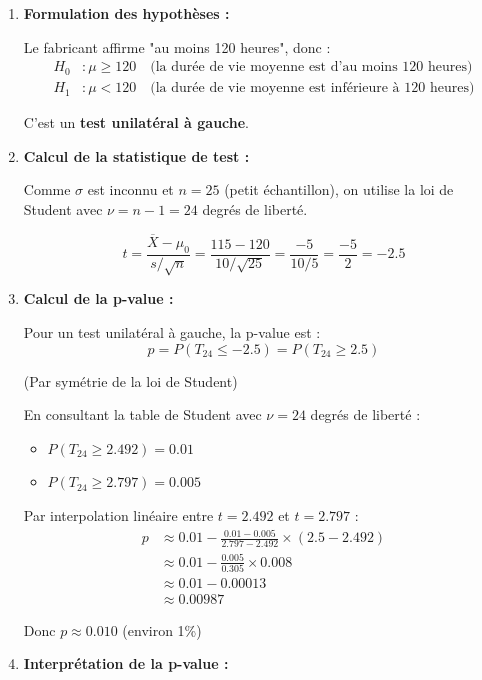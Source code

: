 \documentclass[11pt,a4paper]{article}
\begin{document}
\begin{enumerate}
    \item \textbf{Formulation des hypothèses :}
    
    Le fabricant affirme "au moins 120 heures", donc :
    \begin{align}
    H_0 &: \mu \geq 120 \quad \text{(la durée de vie moyenne est d'au moins 120 heures)} \\
    H_1 &: \mu < 120 \quad \text{(la durée de vie moyenne est inférieure à 120 heures)}
    \end{align}
    
    C'est un \textbf{test unilatéral à gauche}.
    
    \item \textbf{Calcul de la statistique de test :}
    
    Comme $\sigma$ est inconnu et $n = 25$ (petit échantillon), on utilise la loi de Student avec $\nu = n - 1 = 24$ degrés de liberté.
    
    $$t = \frac{\overline{X} - \mu_0}{s/\sqrt{n}} = \frac{115 - 120}{10/\sqrt{25}} = \frac{-5}{10/5} = \frac{-5}{2} = -2.5$$
    
    \item \textbf{Calcul de la p-value :}
    
    Pour un test unilatéral à gauche, la p-value est :
    $$p = P(T_{24} \leq -2.5) = P(T_{24} \geq 2.5)$$
    
    (Par symétrie de la loi de Student)
    
    En consultant la table de Student avec $\nu = 24$ degrés de liberté :
    \begin{itemize}
        \item $P(T_{24} \geq 2.492) = 0.01$
        \item $P(T_{24} \geq 2.797) = 0.005$
    \end{itemize}
    
    Par interpolation linéaire entre $t = 2.492$ et $t = 2.797$ :
    \begin{align}
    p &\approx 0.01 - \frac{0.01 - 0.005}{2.797 - 2.492} \times (2.5 - 2.492) \\
    &\approx 0.01 - \frac{0.005}{0.305} \times 0.008 \\
    &\approx 0.01 - 0.00013 \\
    &\approx 0.00987
    \end{align}
    
    Donc $p \approx 0.010$ (environ 1\%)
    
    \item \textbf{Interprétation de la p-value :}
    

\end{enumerate}
\end{document}
